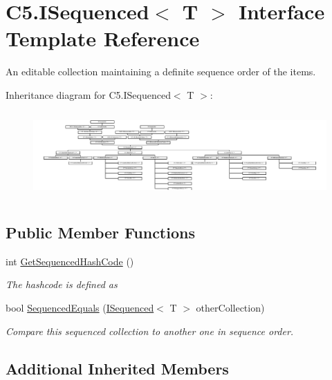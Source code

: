 \hypertarget{interface_c5_1_1_i_sequenced}{}\section{C5.\+I\+Sequenced$<$ T $>$ Interface Template Reference}
\label{interface_c5_1_1_i_sequenced}


An editable collection maintaining a definite sequence order of the items.  


Inheritance diagram for C5.\+I\+Sequenced$<$ T $>$\+:\begin{figure}[H]
\begin{center}
\leavevmode
\includegraphics[height=3.346138cm]{interface_c5_1_1_i_sequenced}
\end{center}
\end{figure}
\subsection*{Public Member Functions}
\begin{DoxyCompactItemize}
\item 
int \hyperlink{interface_c5_1_1_i_sequenced_afb06eeccff646bb763c76c1826b177fe}{Get\+Sequenced\+Hash\+Code} ()
\begin{DoxyCompactList}\small\item\em The hashcode is defined as \end{DoxyCompactList}\item 
bool \hyperlink{interface_c5_1_1_i_sequenced_aeb2be77c5c30ab10f468222f6cbb795f}{Sequenced\+Equals} (\hyperlink{interface_c5_1_1_i_sequenced}{I\+Sequenced}$<$ T $>$ other\+Collection)
\begin{DoxyCompactList}\small\item\em Compare this sequenced collection to another one in sequence order. \end{DoxyCompactList}\end{DoxyCompactItemize}
\subsection*{Additional Inherited Members}


